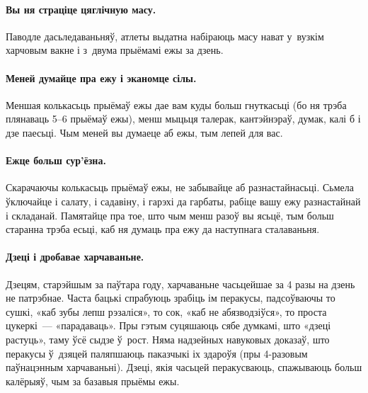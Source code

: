 \paragraph{Вы ня страціце цяглічную масу.}
Паводле дасьледаваньняў, атлеты выдатна набіраюць масу нават у~вузкім харчовым вакне і з~двума прыёмамі ежы за дзень.

\paragraph{Меней думайце пра ежу і эканомце сілы.}
Меншая колькасьць прыёмаў ежы дае вам куды больш гнуткасьці (бо ня трэба плянаваць 5--6 прыёмаў ежы), менш мыцьця талерак, кантэйнэраў, думак, калі б і дзе паесьці. Чым меней вы думаеце аб ежы, тым лепей для вас.

\paragraph{Ежце больш сур'ёзна.}
Скарачаючы колькасьць прыёмаў ежы, не забывайце аб разнастайнасьці. Сьмела ўключайце і салату, і садавіну, і гарэхі да гарбаты, рабіце вашу ежу разнастайнай і складанай. Памятайце пра тое, што чым менш разоў вы ясьцё, тым больш старанна трэба есьці, каб ня думаць пра ежу да наступнага сталаваньня.

\paragraph{Дзеці і дробавае харчаваньне.}
Дзецям, старэйшым за паўтара году, харчаваньне часьцейшае за 4 разы на дзень не патрэбнае. Часта бацькі спрабуюць зрабіць ім перакусы, падсоўваючы то сушкі, «каб зубы лепш рэзаліся», то сок, «каб не абязводзіўся», то проста цукеркі~--- «парадаваць». Пры гэтым суцяшаюць сябе думкамі, што «дзеці растуць», таму ўсё сыдзе ў~рост. Няма надзейных навуковых доказаў, што перакусы ў~дзяцей паляпшаюць паказчыкі іх здароўя (пры 4-разовым паўнацэнным харчаваньні). Дзеці, якія часьцей  перакусваюць, спажываюць больш калёрыяў, чым за базавыя прыёмы ежы.